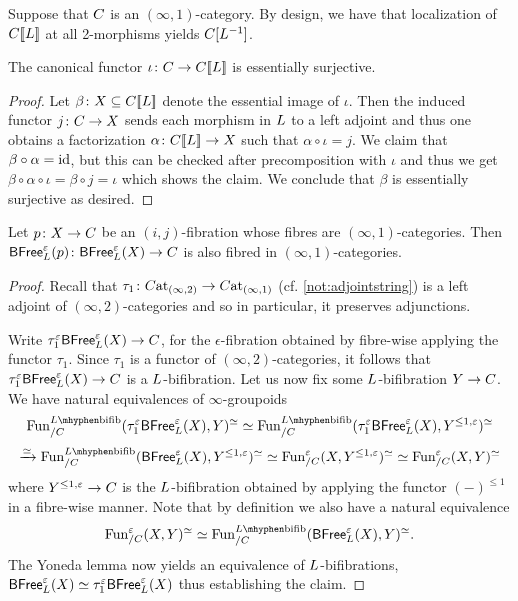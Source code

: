 \documentclass[a4paper,reqno,twoside]{amsart}
\begin{document}
\begin{remark}\label{rem:softstrongloc}
	Suppose that $\relax{C}$ is an $(\infty,1)$-category. By design, we have that localization of $\relax{C}[\![\relax{L}]\!]$ at all 2-morphisms yields $\relax{C}[\relax{L}^{-1}]$. 
\end{remark}

\begin{lemma}\label{lem:softesssurj}
	The canonical functor $\iota \colon \relax{C} \to \relax{C}[\![\relax{L}]\!]$ is essentially surjective.
\end{lemma}
\begin{proof}
	Let $\beta \colon \relax{X} \subseteq \relax{C}[\![\relax{L}]\!]$ denote the essential image of $\iota$. Then the induced functor $j \colon \relax{C} \to \relax{X}$ sends each morphism in $\relax{L}$ to a left adjoint and thus one obtains a factorization $ \alpha \colon  \relax{C}[\![\relax{L}]\!] \to \relax{X}$ such that $\alpha \circ \iota=j$. We claim that $\beta \circ \alpha=\mathrm{id}$, but this can be checked after precomposition with $\iota$ and thus we get $\beta \circ \alpha \circ \iota= \beta \circ j=\iota$ which shows the claim.  We conclude that $\beta$ is essentially surjective as desired.
\end{proof}

\begin{proposition}\label{prop:1dimnfibres}
	Let $p \colon \relax{X} \to \relax{C}$ be an $(i,j)$-fibration whose fibres are $(\infty,1)$-categories. Then $\mathsf{BFree}^{\varepsilon}_{\relax{L}}(p)\colon \mathsf{BFree}^{\varepsilon}_{\relax{L}}(\relax{X}) \to \relax{C}$ is also fibred in $(\infty,1)$-categories.
\end{proposition}
\begin{proof}
   Recall that $\tau_1 \colon \relax{C}\mathrm{at}_{(\infty,2)} \to \relax{C}\mathrm{at}_{(\infty,1)}$ (cf. \cref{not:adjointstring}) is a left adjoint of $(\infty,2)$-categories and so in particular, it preserves adjunctions.
	
   Write $\tau^{\varepsilon}_1 \mathsf{BFree}^{\varepsilon}_{\relax{L}}(\relax{X}) \to \relax{C}$, for the $\epsilon$-fibration obtained by fibre-wise applying the functor $\tau_1$. Since $\tau_1$ is a functor of $(\infty,2)$-categories, it follows that $\tau^{\varepsilon}_1 \mathsf{BFree}^{\varepsilon}_{\relax{L}}(\relax{X}) \to \relax{C}$ is a $\relax{L}$-bifibration. Let us now fix some $\relax{L}$-bifibration $\relax{Y} \to \relax{C}$. We have  natural equivalences of $\infty$-groupoids
	\[
		\Fun_{/\cC}^{\cL\mhyphen\bifib}(\tau_1^{\epsilon}\BFree^{\epsilon}_{\cL}(\cX),\cY)^{\simeq}\simeq \Fun_{/\cC}^{\cL\mhyphen\bifib}(\tau_1^{\epsilon}\BFree^{\epsilon}_{\cL}(\cX),\cY^{\leq 1,\epsilon})^{\simeq} 
	\]
	\[
		\xrightarrow{\simeq}\Fun_{/\cC}^{\cL\mhyphen\bifib}(\BFree^{\epsilon}_{\cL}(\cX),\cY^{\leq 1,\epsilon})^{\simeq}\simeq \Fun_{/\cC}^{\epsilon}(\cX,\cY^{\leq 1,\epsilon})^{\simeq} \simeq \Fun_{/\cC}^{\epsilon}(\cX,\cY)^{\simeq}
	\]
	where $\relax{Y}^{\leq 1,\varepsilon} \to \relax{C}$ is the $\relax{L}$-bifibration obtained by applying the functor $(-)^{\leq 1}$ in a fibre-wise manner. Note that by definition we also have a natural equivalence
	\[
		\Fun_{/\cC}^{\epsilon}(\cX,\cY)^{\simeq} \simeq \Fun_{/\cC}^{\cL\mhyphen\bifib}(\BFree^{\epsilon}_\cL(\cX),\cY)^{\simeq}.
	\]
     The Yoneda lemma now yields an equivalence of $\relax{L}$-bifibrations, $\mathsf{BFree}^{\varepsilon}_{\relax{L}}(\relax{X})\simeq \tau^{\varepsilon}_1 \mathsf{BFree}^{\varepsilon}_{\relax{L}}(\relax{X})$ thus establishing the claim.
\end{proof}
\end{document}
